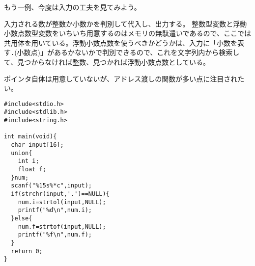 もう一例、今度は入力の工夫を見てみよう。
\begin{boxnote}
\begin{multicols}{2}
入力される数が整数か小数かを判別して代入し、出力する。
整数型変数と浮動小数点数型変数をいちいち用意するのはメモリの無駄遣いであるので、ここでは共用体を用いている。浮動小数点数を使うべきかどうかは、入力に「小数を表す\verb|.|(小数点)」があるかないかで判別できるので、これを文字列内から検索して、見つからなければ整数、見つかれば浮動小数点数としている。

ポインタ自体は用意していないが、アドレス渡しの関数が多い点に注目されたい。

\begin{lstlisting}[caption=整数/小数の判別,label=program10_7]
#include<stdio.h>
#include<stdlib.h>
#include<string.h>

int main(void){
  char input[16];
  union{
    int i;
    float f;
  }num;
  scanf("%15s%*c",input);
  if(strchr(input,'.')==NULL){
    num.i=strtol(input,NULL);
    printf("%d\n",num.i);
  }else{
    num.f=strtof(input,NULL);
    printf("%f\n",num.f);
  }
  return 0;
}
\end{lstlisting}
\end{multicols}
\end{boxnote}

